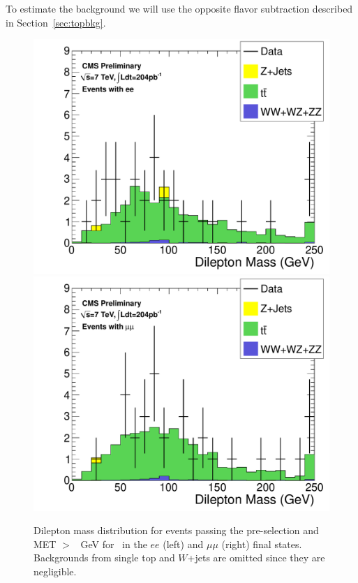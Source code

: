 To estimate the \ttbar background we will use the opposite flavor subtraction
 described in Section~\ref{sec:topbkg}.


\begin{figure}[hbt]
\begin{center}
\includegraphics[width=0.48\linewidth]{plots/hdilmass_pfmet60_ee_allj.pdf}
\includegraphics[width=0.48\linewidth]{plots/hdilmass_pfmet60_mm_allj.pdf}
\caption{\label{fig:dilmass60}\protect Dilepton mass distribution for events passing the pre-selection 
  and MET $>$ \signalmetl~GeV for \lumi\ in the $ee$ (left) and $\mu\mu$ (right) final states. 
Backgrounds from single top and $W$+jets are omitted since they are negligible.}
\end{center}
\end{figure}

